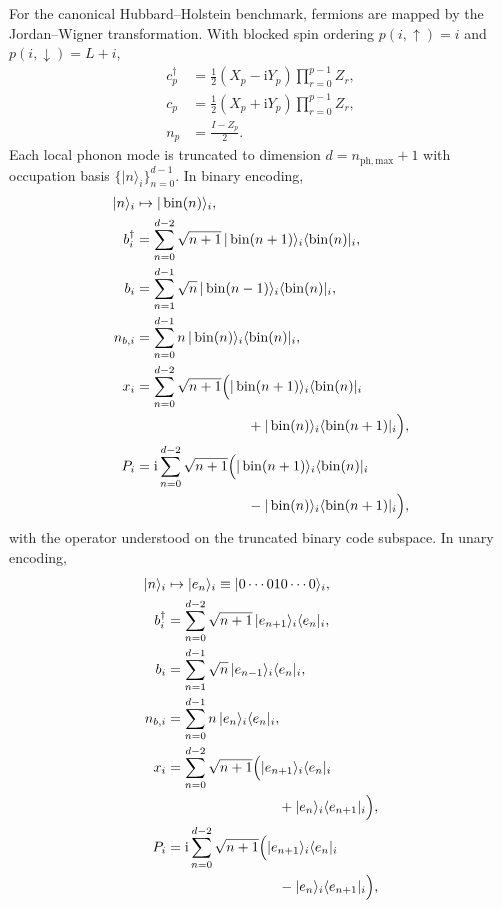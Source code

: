 \documentclass[
  reprint,
  amsmath,
  amssymb,
  aps,
  pra,
  nofootinbib,
  superscriptaddress,
  floatfix
]{revtex4-2}
\newcommand{\ii}{\mathrm{i}}
\newcommand{\phmax}{n_{\mathrm{ph,max}}}
\newcommand{\ket}[1]{|#1\rangle}
\newcommand{\bra}[1]{\langle #1|}
\begin{document}
For the canonical Hubbard--Holstein benchmark, fermions are mapped by the Jordan--Wigner transformation. With blocked spin ordering $p(i,\uparrow)=i$ and $p(i,\downarrow)=L+i$,
\begin{equation}
\begin{aligned}
c_p^{\dagger}&=\frac12(X_p-\ii Y_p)\prod_{r=0}^{p-1}Z_r,\\
c_p&=\frac12(X_p+\ii Y_p)\prod_{r=0}^{p-1}Z_r,\\
n_p&=\frac{I-Z_p}{2} .
\end{aligned}
\label{eq:jw_map}
\end{equation}
Each local phonon mode is truncated to dimension $d=\phmax+1$ with occupation basis $\{\ket{n}_i\}_{n=0}^{d-1}$. In binary encoding,
\begin{equation}
\begin{aligned}
\ket{n}_i&\mapsto \ket{\operatorname{bin}(n)}_i,\\
b_i^{\dagger}&=\sum_{n=0}^{d-2}\sqrt{n+1}\,\ket{\operatorname{bin}(n+1)}_i\bra{\operatorname{bin}(n)}_i,\\
b_i&=\sum_{n=1}^{d-1}\sqrt{n}\,\ket{\operatorname{bin}(n-1)}_i\bra{\operatorname{bin}(n)}_i,\\
n_{b,i}&=\sum_{n=0}^{d-1}n\,\ket{\operatorname{bin}(n)}_i\bra{\operatorname{bin}(n)}_i,\\
x_i&=\sum_{n=0}^{d-2}\sqrt{n+1}\Bigl(\ket{\operatorname{bin}(n+1)}_i\bra{\operatorname{bin}(n)}_i\\
&\qquad\qquad\qquad\qquad+\ket{\operatorname{bin}(n)}_i\bra{\operatorname{bin}(n+1)}_i\Bigr),\\
P_i&=\ii\sum_{n=0}^{d-2}\sqrt{n+1}\Bigl(\ket{\operatorname{bin}(n+1)}_i\bra{\operatorname{bin}(n)}_i\\
&\qquad\qquad\qquad\qquad-\ket{\operatorname{bin}(n)}_i\bra{\operatorname{bin}(n+1)}_i\Bigr),
\end{aligned}
\label{eq:boson_binary_encoding}
\end{equation}
with the operator understood on the truncated binary code subspace. In unary encoding,
\begin{equation}
\begin{aligned}
\ket{n}_i&\mapsto \ket{e_n}_i\equiv\ket{0\cdots 010\cdots 0}_i,\\
b_i^{\dagger}&=\sum_{n=0}^{d-2}\sqrt{n+1}\,\ket{e_{n+1}}_i\bra{e_n}_i,\\
b_i&=\sum_{n=1}^{d-1}\sqrt{n}\,\ket{e_{n-1}}_i\bra{e_n}_i,\\
n_{b,i}&=\sum_{n=0}^{d-1}n\,\ket{e_n}_i\bra{e_n}_i,\\
x_i&=\sum_{n=0}^{d-2}\sqrt{n+1}\Bigl(\ket{e_{n+1}}_i\bra{e_n}_i\\
&\qquad\qquad\qquad\qquad+\ket{e_n}_i\bra{e_{n+1}}_i\Bigr),\\
P_i&=\ii\sum_{n=0}^{d-2}\sqrt{n+1}\Bigl(\ket{e_{n+1}}_i\bra{e_n}_i\\
&\qquad\qquad\qquad\qquad-\ket{e_n}_i\bra{e_{n+1}}_i\Bigr),
\end{aligned}
\label{eq:boson_unary_encoding}
\end{equation}
\end{document}
